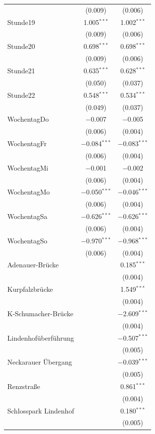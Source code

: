 \documentclass[a4paper,12pt]{thesis}
\begin{document}
\begin{longtable}{@{\extracolsep{-5pt}}lcc}
		& (0.009) & (0.006) \\ 
		Stunde19 & 1.005$^{***}$ & 1.002$^{***}$ \\ 
		& (0.009) & (0.006) \\ 
		Stunde20 & 0.698$^{***}$ & 0.698$^{***}$ \\ 
		& (0.009) & (0.006) \\ 
		Stunde21 & 0.635$^{***}$ & 0.628$^{***}$ \\ 
		& (0.050) & (0.037) \\ 
		Stunde22 & 0.548$^{***}$ & 0.534$^{***}$ \\ 
		& (0.049) & (0.037) \\ 
		WochentagDo & $-$0.007 & $-$0.005 \\ 
		& (0.006) & (0.004) \\ 
		WochentagFr & $-$0.084$^{***}$ & $-$0.083$^{***}$ \\ 
		& (0.006) & (0.004) \\ 
		WochentagMi & $-$0.001 & $-$0.002 \\ 
		& (0.006) & (0.004) \\ 
		WochentagMo & $-$0.050$^{***}$ & $-$0.046$^{***}$ \\ 
		& (0.006) & (0.004) \\ 
		WochentagSa & $-$0.626$^{***}$ & $-$0.626$^{***}$ \\ 
		& (0.006) & (0.004) \\ 
		WochentagSo & $-$0.970$^{***}$ & $-$0.968$^{***}$ \\ 
		& (0.006) & (0.004) \\ 
		Adenauer-Brücke &  & 0.185$^{***}$ \\ 
		&  & (0.004) \\ 
		Kurpfalzbrücke &  & 1.549$^{***}$ \\ 
		&  & (0.004) \\ 
		K-Schumacher-Brücke &  & $-$2.609$^{***}$ \\ 
		&  & (0.004) \\ 
		Lindenhofüberführung &  & $-$0.507$^{***}$ \\ 
		&  & (0.005) \\ 
		Neckarauer Übergang &  & $-$0.039$^{***}$ \\ 
		&  & (0.005) \\ 
		Renzstraße &  & 0.861$^{***}$ \\ 
		&  & (0.004) \\ 
		Schlosspark Lindenhof &  & 0.180$^{***}$ \\ 
		&  & (0.005) \\ 

\end{longtable}
\end{document}
